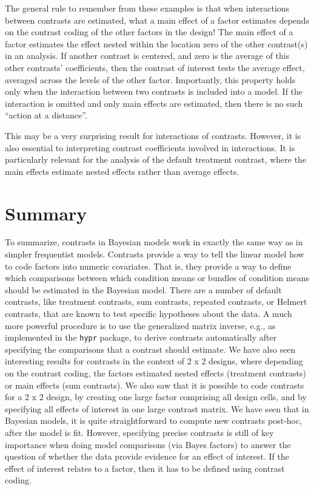 \documentclass[12pt,]{krantz}
\theoremstyle{definition}
\theoremstyle{definition}
\theoremstyle{definition}
\theoremstyle{remark}
\begin{document}
The general rule to remember from these examples is that when interactions between contrasts are estimated, what a main effect of a factor estimates depends on the contrast coding of the other factors in the design! The main effect of a factor estimates the effect nested within the location zero of the other contrast(s) in an analysis. If another contrast is centered, and zero is the average of this other contrasts' coefficients, then the contrast of interest tests the average effect, averaged across the levels of the other factor. Importantly, this property holds only when the interaction between two contrasts is included into a model. If the interaction is omitted and only main effects are estimated, then there is no such ``action at a distance''.

This may be a very surprising result for interactions of contrasts. However, it is also essential to interpreting contrast coefficients involved in interactions. It is particularly relevant for the analysis of the default treatment contrast, where the main effects estimate nested effects rather than average effects.

\hypertarget{summary-3}{%
\section{Summary}\label{summary-3}}

To summarize, contrasts in Bayesian models work in exactly the same way as in simpler frequentist models. Contrasts provide a way to tell the linear model how to code factors into numeric covariates. That is, they provide a way to define which comparisons between which condition means or bundles of condition means should be estimated in the Bayesian model. There are a number of default contrasts, like treatment contrasts, sum contrasts, repeated contrasts, or Helmert contrasts, that are known to test specific hypotheses about the data. A much more powerful procedure is to use the generalized matrix inverse, e.g., as implemented in the \texttt{hypr} package, to derive contrasts automatically after specifying the comparisons that a contrast should estimate. We have also seen interesting results for contrasts in the context of 2 x 2 designs, where depending on the contrast coding, the factors estimated nested effects (treatment contrasts) or main effects (sum contrasts). We also saw that it is possible to code contrasts for a 2 x 2 design, by creating one large factor comprising all design cells, and by specifying all effects of interest in one large contrast matrix. We have seen that in Bayesian models, it is quite straightforward to compute new contrasts post-hoc, after the model is fit. However, specifying precise contrasts is still of key importance when doing model comparisons (via Bayes factors) to answer the question of whether the data provide evidence for an effect of interest. If the effect of interest relates to a factor, then it has to be defined using contrast coding.
\end{document}
